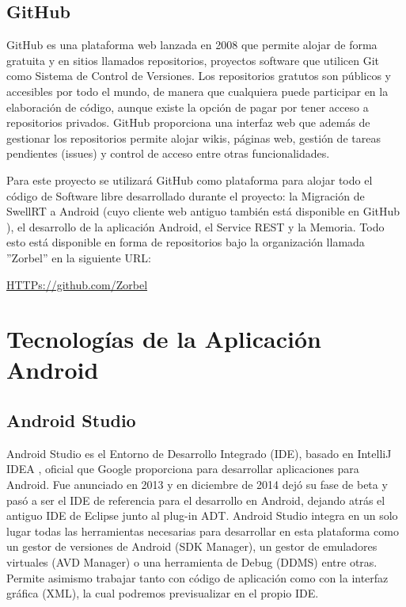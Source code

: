     \subsection{GitHub}\label{ssec:github}
    
    GitHub \cite{ref:github} es una plataforma web lanzada en 2008 que permite alojar de forma gratuita y en sitios llamados repositorios, proyectos software que utilicen Git como Sistema de Control de Versiones. Los repositorios gratutos son públicos y accesibles por todo el mundo, de manera que cualquiera puede participar en la elaboración de código, aunque existe la opción de pagar por tener acceso a repositorios privados. GitHub proporciona una interfaz web que además de gestionar los repositorios permite alojar wikis, páginas web, gestión de tareas pendientes (issues) y control de acceso entre otras funcionalidades.
    
    Para este proyecto se utilizará GitHub como plataforma para alojar todo el código de Software libre desarrollado durante el proyecto: la Migración de SwellRT a Android (cuyo cliente web antiguo también está disponible en GitHub \cite{ref:swellRT_github}), el desarrollo de la aplicación Android, el Service REST y la Memoria. Todo esto está disponible en forma de repositorios bajo la organización llamada ''Zorbel'' en la siguiente URL:
    
    \url{HTTPs://github.com/Zorbel}    

\section{Tecnologías de la Aplicación Android}
    
    \subsection{Android Studio}\label{ssec:androidStudio}
    
	Android Studio \cite{ref:android_studio} es el Entorno de Desarrollo Integrado (IDE), basado en IntelliJ IDEA \cite{ref:intelliJ_Idea}, oficial que Google proporciona para desarrollar aplicaciones para Android. Fue anunciado en 2013 y en diciembre de 2014 dejó su fase de beta y pasó a ser el IDE de referencia para el desarrollo en Android, dejando atrás el antiguo IDE de Eclipse junto al plug-in ADT. Android Studio integra en un solo lugar todas las herramientas necesarias para desarrollar en esta plataforma como un gestor de versiones de Android (SDK Manager), un gestor de emuladores virtuales (AVD Manager) o una herramienta de Debug (DDMS) entre otras. Permite asimismo trabajar tanto con código de aplicación como con la interfaz gráfica (XML), la cual podremos previsualizar en el propio IDE.
	
